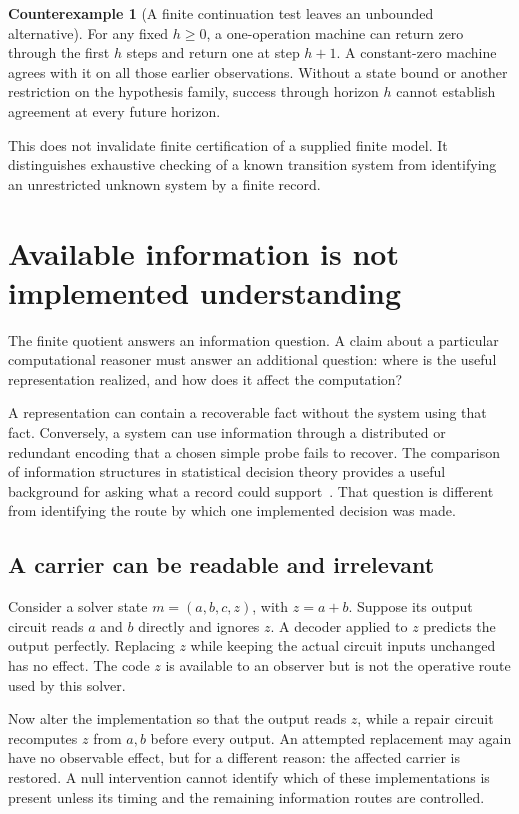 \documentclass[11pt,letterpaper]{article}
\theoremstyle{plain}
\theoremstyle{definition}
\newtheorem{counterexample}[theorem]{Counterexample}
\begin{document}
\begin{counterexample}[A finite continuation test leaves an unbounded alternative]\label{ex:horizon}
For any fixed $h\geq0$, a one-operation machine can return zero through the first $h$ steps and return one at step $h+1$. A constant-zero machine agrees with it on all those earlier observations. Without a state bound or another restriction on the hypothesis family, success through horizon $h$ cannot establish agreement at every future horizon.
\end{counterexample}
This does not invalidate finite certification of a supplied finite model. It distinguishes exhaustive checking of a known transition system from identifying an unrestricted unknown system by a finite record.

\section{Available information is not implemented understanding}\label{sec:use}
The finite quotient answers an information question. A claim about a particular computational reasoner must answer an additional question: where is the useful representation realized, and how does it affect the computation?

A representation can contain a recoverable fact without the system using that fact. Conversely, a system can use information through a distributed or redundant encoding that a chosen simple probe fails to recover. The comparison of information structures in statistical decision theory provides a useful background for asking what a record could support~\cite{blackwell}. That question is different from identifying the route by which one implemented decision was made.

\subsection{A carrier can be readable and irrelevant}
Consider a solver state $m=(a,b,c,z)$, with $z=a+b$. Suppose its output circuit reads $a$ and $b$ directly and ignores $z$. A decoder applied to $z$ predicts the output perfectly. Replacing $z$ while keeping the actual circuit inputs unchanged has no effect. The code $z$ is available to an observer but is not the operative route used by this solver.

Now alter the implementation so that the output reads $z$, while a repair circuit recomputes $z$ from $a,b$ before every output. An attempted replacement may again have no observable effect, but for a different reason: the affected carrier is restored. A null intervention cannot identify which of these implementations is present unless its timing and the remaining information routes are controlled.
\end{document}
